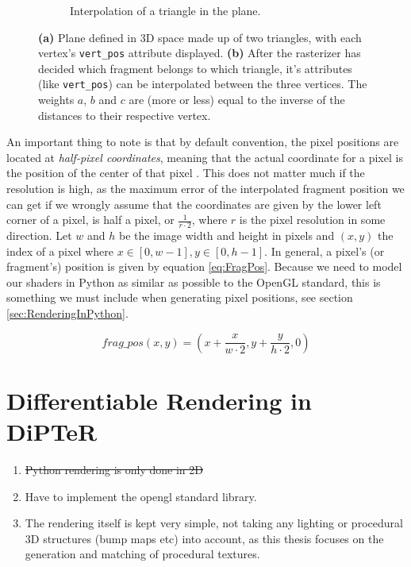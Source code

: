 \begin{figure}[!h]
\begin{subfigure}{.5\textwidth}
    \caption{Interpolation of a triangle in the plane.}
    \label{fig:InterpolationRight}
\end{subfigure}
\caption{
    \textbf{(a)} Plane defined in 3D space made up of two triangles, with each vertex's \texttt{vert\_pos} attribute displayed. \textbf{(b)} After the rasterizer has decided which fragment belongs to which triangle, it's attributes (like \texttt{vert\_pos}) can be interpolated between the three vertices. The weights $a$, $b$ and $c$ are (more or less) equal to the inverse of the distances to their respective vertex.
}
\label{fig:Interpolation}
\end{figure}
An important thing to note is that by default convention, the pixel positions are located at \textit{half-pixel coordinates}, meaning that the actual coordinate for a pixel is the position of the center of that pixel \cite{segal_2013_the}. This does not matter much if the resolution is high, as the maximum error of the interpolated fragment position  we can get if we wrongly assume that the coordinates are given by the lower left corner of a pixel, is half a pixel, or $\frac{1}{r\cdot 2}$, where $r$ is the pixel resolution in some direction. Let $w$ and $h$ be the image width and height in pixels and $(x,y)$ the index of a pixel where $x \in [0,w-1], y \in [0,h-1]$. In general, a pixel's (or fragment's) position is given by equation \ref{eq:FragPos}. Because we need to model our shaders in Python as similar as possible to the OpenGL standard, this is something we must include when generating pixel positions, see section \ref{sec:RenderingInPython}.

\begin{equation}\label{eq:FragPos}
frag\_pos(x,y) = (x + \frac{x}{w \cdot 2}, y + \frac{y}{h \cdot 2}, 0)
\end{equation}


\section{Differentiable Rendering in DiPTeR}\label{sec:RenderingInDiPTeR}

\begin{enumerate}
    \item \st{Python rendering is only done in 2D}
    \item Have to implement the opengl standard library.
    \item The rendering itself is kept very simple, not taking any lighting or procedural 3D structures (bump maps etc) into account, as this thesis focuses on the generation and matching of procedural textures. 
\end{enumerate}

